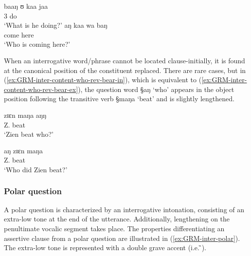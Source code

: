 \begin{exe}
 \ex\label{ex:GRM-inter-content}
\begin{xlist}
\ex\label{ex:GRM-inter-content-what}
\gll baaŋ ʊ kaa jaa\\
{\q} {3\sg} {\ipfv} do \\
 \glt  `What is he doing?' 
\ex\label{ex:GRM-inter-content-who}
\gll aŋ kaa wa baŋ\\
{\q}  {\ipfv} come here\\
\glt  `Who is coming here?'
\end{xlist}
\end{exe}

When an interrogative word/phrase cannot be located clause-initially,  it is
found at the canonical position of the constituent replaced. There are
rare cases, but in (\ref{ex:GRM-inter-content-who-rev-bear-in}), which is
equivalent to  (\ref{ex:GRM-inter-content-who-rev-bear-ex}),  the question
word {\S aŋ} `who' appears in the object position following the transitive verb
{\S maŋa} `beat' and is slightly lengthened. 


\begin{exe}
 \ex\label{ex:GRM-inter-content-who-rev-bear}
\begin{xlist}
\begin{multicols}{2}
 \ex\label{ex:GRM-inter-content-who-rev-bear-in}
\gll  zɪɛn maŋa aŋŋ\\
 Z. beat {\q} \\
 \glt  `Zien beat who?'

 \ex\label{ex:GRM-inter-content-who-rev-bear-ex}
\gll  aŋ zɪɛn maŋa\\
{\q} Z. beat \\
 \glt  `Who did Zien beat?'
\end{multicols}
\end{xlist}
\end{exe}





\subsubsection{Polar question}
\label{sec:GRM-interr-polar}

A polar question is characterized by an interrogative intonation, consisting of
an extra-low tone at the end of the utterance. Additionally, lengthening  on the
penultimate vocalic segment takes place. The properties differentiating an
assertive clause from a polar question are illustrated in
(\ref{ex:GRM-inter-polar}). The
extra-low tone is represented with a double grave accent (i.e.  ̏). 


